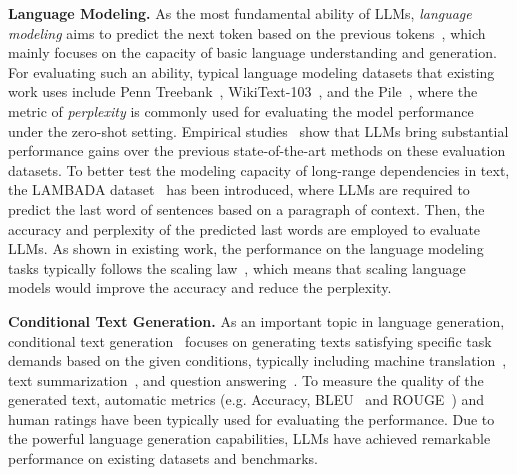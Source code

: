{{{{{\textbf{Language Modeling.} As the most fundamental ability of LLMs, \emph{language modeling} aims  to predict the next token based on the previous tokens~\cite{Bengio-JMLR-2003-A}, which mainly focuses on the capacity of basic language understanding and generation.  For evaluating such an ability, typical language modeling datasets that existing work uses include Penn Treebank~\cite{Marcus-CL-1993-Building}, WikiText-103~\cite{Merity-ICLR-2017-Pointer}, and the Pile~\cite{Gao-arxiv-2021-Pile}, where the metric of \emph{perplexity} is commonly used for evaluating the model performance under the zero-shot setting. Empirical studies~\cite{Brown-NeurIPS-2020-Language,Zeng-arxiv-2022-GLM} show that LLMs bring substantial performance gains over the previous state-of-the-art methods on these evaluation datasets. To better test the modeling capacity of long-range dependencies in text, the LAMBADA dataset~\cite{Paperno-ACL-2016-LAMBADA} has been introduced, where LLMs are required to predict the last word of sentences based on a paragraph of context. Then, the accuracy and perplexity of the predicted last words are employed  to evaluate LLMs. As shown in existing work, the performance on the language modeling tasks typically follows the scaling law~\cite{Kaplan-arxiv-2020-Scaling}, which means that scaling language models would improve the accuracy and reduce the perplexity.

\textbf{Conditional Text Generation.} As an important topic in language generation, conditional text generation~\cite{Li-IJCAI-2021-Pretrained} focuses on generating texts satisfying specific task demands based on the given conditions, typically including machine translation~\cite{Bahdanau-ICLR-2015-Neural}, text summarization~\cite{Nallapati-acl-2016-Abstractive}, and question answering~\cite{Berant-EMNLP-2013-Semantic}. {To measure the quality of the generated text, automatic metrics (e.g. Accuracy, BLEU~\cite{Papineni-acl-2002-bleu} and ROUGE~\cite{lin-acl-2004-rouge}) and human ratings have been typically used for evaluating the performance. } Due to the powerful language generation capabilities, LLMs have achieved remarkable performance on existing datasets and benchmarks.

}}}}}
